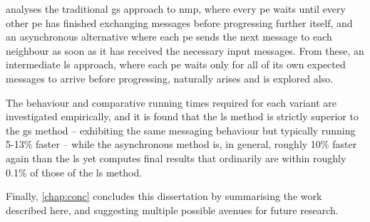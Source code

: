  analyses the traditional \gls{gs} approach to \gls{nmp}, where every \gls{pe} waits until every other \gls{pe} has finished exchanging messages before progressing further itself, and an asynchronous alternative where each \gls{pe} sends the next message to each neighbour as soon as it has received the necessary input messages.  From these, an intermediate \gls{ls} approach, where each \gls{pe} waits only for all of its own expected messages to arrive before progressing, naturally arises and is explored also.

The behaviour and comparative running times required for each variant are investigated empirically, and it is found that the \gls{ls} method is strictly superior to the \gls{gs} method -- exhibiting the same messaging behaviour but typically running 5-13\% faster -- while the asynchronous method is, in general, roughly 10\% faster again than the \gls{ls} yet computes final results that ordinarily are within roughly 0.1\% of those of the \gls{ls} method.

Finally, \cref{chap:conc} concludes this dissertation by summarising the work described here, and suggesting multiple possible avenues for future research.